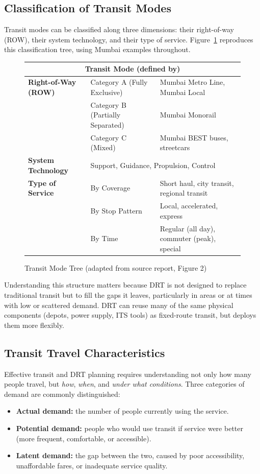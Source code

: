 \documentclass[12pt]{article}
\begin{document}
\subsection{Classification of Transit Modes}

Transit modes can be classified along three dimensions: their right-of-way (ROW),
their system technology, and their type of service. Figure~\ref{fig:transit-tree}
reproduces this classification tree, using Mumbai examples throughout.

\begin{figure}[H]
\centering
\small
\begin{tabular}{p{3.6cm}p{3.6cm}p{6.7cm}}
\toprule
\multicolumn{3}{c}{\textbf{Transit Mode (defined by)}} \\
\midrule
\textbf{Right-of-Way (ROW)} & Category A (Fully Exclusive) & Mumbai Metro Line, Mumbai Local \\
 & Category B (Partially Separated) & Mumbai Monorail \\
 & Category C (Mixed) & Mumbai BEST buses, streetcars \\
\midrule
\textbf{System Technology} & \multicolumn{2}{l}{Support, Guidance, Propulsion, Control} \\
\midrule
\textbf{Type of Service} & By Coverage & Short haul, city transit, regional transit \\
 & By Stop Pattern & Local, accelerated, express \\
 & By Time & Regular (all day), commuter (peak), special \\
\bottomrule
\end{tabular}
\caption{Transit Mode Tree (adapted from source report, Figure 2)}
\label{fig:transit-tree}
\end{figure}

Understanding this structure matters because DRT is not designed to replace
traditional transit but to fill the gaps it leaves, particularly in areas or at
times with low or scattered demand. DRT can reuse many of the same physical
components (depots, power supply, ITS tools) as fixed-route transit, but deploys
them more flexibly.

\subsection{Transit Travel Characteristics}

Effective transit and DRT planning requires understanding not only how many people
travel, but \textit{how}, \textit{when}, and \textit{under what conditions}. Three
categories of demand are commonly distinguished:
\begin{itemize}[nosep]
  \item \textbf{Actual demand:} the number of people currently using the service.
  \item \textbf{Potential demand:} people who would use transit if service were
    better (more frequent, comfortable, or accessible).
  \item \textbf{Latent demand:} the gap between the two, caused by poor
    accessibility, unaffordable fares, or inadequate service quality.
\end{itemize}
\end{document}
